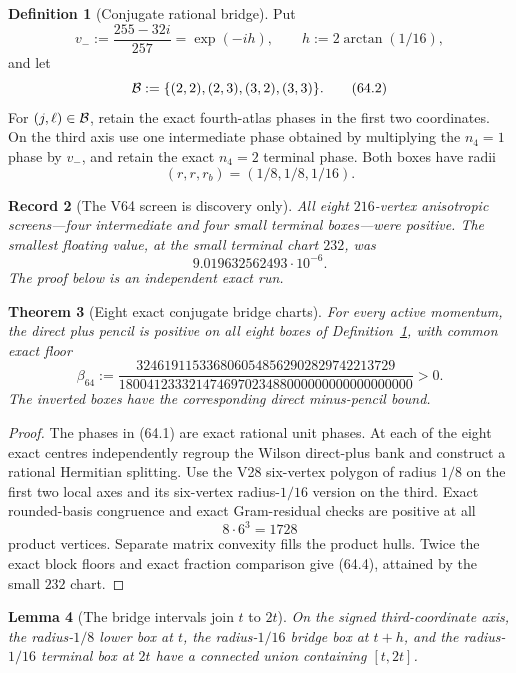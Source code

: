 \documentclass[11pt,oneside]{article}
\newtheorem{theorem}{Theorem}[section]
\newtheorem{lemma}[theorem]{Lemma}
\newtheorem{record}[theorem]{Record}
\theoremstyle{definition}
\newtheorem{definition}[theorem]{Definition}
\theoremstyle{remark}
\begin{document}
\begin{definition}[Conjugate rational bridge]
\label{def:newv64-bridge}
Put
\[
 v_-:=\frac{255-32i}{257}
 =\exp(-ih),\qquad h:=2\arctan(1/16),                 \tag{64.1}
\]
and let
\[
 {\cal B}:=\{(2,2),(2,3),(3,2),(3,3)\}.              \tag{64.2}
\]
For \((j,\ell)\in{\cal B}\), retain the exact fourth-atlas phases
in the first two coordinates.  On the third axis use one
intermediate phase obtained by multiplying the \(n_4=1\) phase by
\(v_-\), and retain the exact \(n_4=2\) terminal phase.  Both boxes
have radii
\[
 (r,r,r_b)=(1/8,1/8,1/16).                           \tag{64.3}
\]
\end{definition}

\begin{record}[The V64 screen is discovery only]
\label{rec:newv64-screen}
All eight \(216\)-vertex anisotropic screens—four intermediate and
four small terminal boxes—were positive.  The smallest floating
value, at the small terminal chart \(232\), was
\[
 9.019632562493\cdot10^{-6}.
\]
The proof below is an independent exact run.
\end{record}

\begin{theorem}[Eight exact conjugate bridge charts]
\label{thm:newv64-eight-bridges}
For every active momentum, the direct plus pencil is positive on
all eight boxes of Definition~\ref{def:newv64-bridge}, with common
exact floor
\[
 \beta_{64}:=
 \frac{3246191153368060548562902829742213729}
 {180041233321474697023488000000000000000000}>0.      \tag{64.4}
\]
The inverted boxes have the corresponding direct minus-pencil
bound.
\end{theorem}

\begin{proof}
The phases in (64.1) are exact rational unit phases.  At each of
the eight exact centres independently regroup the Wilson
direct-plus bank and construct a rational Hermitian splitting.
Use the V28 six-vertex polygon of radius \(1/8\) on the first two
local axes and its six-vertex radius-\(1/16\) version on the third.
Exact rounded-basis congruence and exact Gram-residual checks are
positive at all
\[
 8\cdot6^3=1728                                       \tag{64.5}
\]
product vertices.  Separate matrix convexity fills the product
hulls.  Twice the exact block floors and exact fraction comparison
give (64.4), attained by the small \(232\) chart.
\end{proof}

\begin{lemma}[The bridge intervals join \(t\) to \(2t\)]
\label{lem:newv64-overlap}
On the signed third-coordinate axis, the radius-\(1/8\) lower box
at \(t\), the radius-\(1/16\) bridge box at \(t+h\), and the
radius-\(1/16\) terminal box at \(2t\) have a connected union
containing \([t,2t]\).
\end{lemma}
\end{document}
